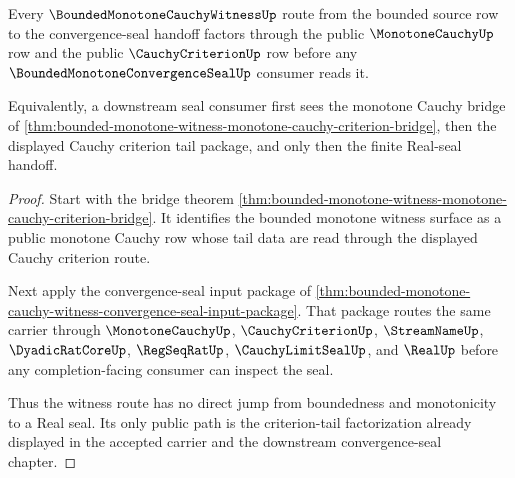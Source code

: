 \begin{theorem}
\label{thm:bounded-monotone-cauchy-witness-criterion-tail-factorization}
Every $\BoundedMonotoneCauchyWitnessUp$ route from the bounded source row to the convergence-seal handoff factors through the public $\MonotoneCauchyUp$ row and the public $\CauchyCriterionUp$ row before any $\BoundedMonotoneConvergenceSealUp$ consumer reads it.

Equivalently, a downstream seal consumer first sees the monotone Cauchy bridge of \autoref{thm:bounded-monotone-witness-monotone-cauchy-criterion-bridge}, then the displayed Cauchy criterion tail package, and only then the finite Real-seal handoff.
\end{theorem}
\begin{proof}
Start with the bridge theorem \autoref{thm:bounded-monotone-witness-monotone-cauchy-criterion-bridge}. It identifies the bounded monotone witness surface as a public monotone Cauchy row whose tail data are read through the displayed Cauchy criterion route.

Next apply the convergence-seal input package of \autoref{thm:bounded-monotone-cauchy-witness-convergence-seal-input-package}. That package routes the same carrier through $\MonotoneCauchyUp$, $\CauchyCriterionUp$, $\StreamNameUp$, $\DyadicRatCoreUp$, $\RegSeqRatUp$, $\CauchyLimitSealUp$, and $\RealUp$ before any completion-facing consumer can inspect the seal.

Thus the witness route has no direct jump from boundedness and monotonicity to a Real seal. Its only public path is the criterion-tail factorization already displayed in the accepted carrier and the downstream convergence-seal chapter.
\end{proof}

